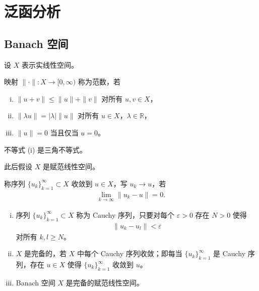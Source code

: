 \documentclass[../main.tex]{subfiles}
\begin{document}
\chapter{泛函分析}\label{chapter:appD-泛函分析}

\section{Banach 空间}\label{section:appD-Banach空间}

设 $X$ 表示实线性空间。

\begin{definition}\label{definition:appD-范数}
映射 $\|\cdot\|:X\to[0,\infty)$ 称为范数，若
\begin{enumerate}[(i)]
\item $\|u+v\|\leqslant\|u\|+\|v\|$ 对所有 $u,v\in X$，
\item $\|\lambda u\|=|\lambda|\|u\|$ 对所有 $u\in X$，$\lambda\in\mathbb{R}$，
\item $\|u\|=0$ 当且仅当 $u=0$。
\end{enumerate}
不等式 (i) 是三角不等式。
\end{definition}

此后假设 $X$ 是赋范线性空间。

\begin{definition}\label{definition:appD-收敛}
称序列 $\{u_k\}_{k=1}^\infty\subset X$ 收敛到 $u\in X$，写 $u_k\to u$，若
\begin{align*}
\lim_{k\to\infty}\|u_k-u\|=0.
\end{align*}
\end{definition}

\begin{definition}\label{definition:appD-完备}
\begin{enumerate}[(i)]
\item 序列 $\{u_k\}_{k=1}^\infty\subset X$ 称为 Cauchy 序列，只要对每个 $\varepsilon>0$ 存在 $N>0$ 使得
\begin{align*}
\|u_k-u_l\|<\varepsilon
\end{align*}
对所有 $k,l\geqslant N$。

\item $X$ 是完备的，若 $X$ 中每个 Cauchy 序列收敛；即每当 $\{u_k\}_{k=1}^\infty$ 是 Cauchy 序列，存在 $u\in X$ 使得 $\{u_k\}_{k=1}^\infty$ 收敛到 $u$。

\item Banach 空间 $X$ 是完备的赋范线性空间。
\end{enumerate}
\end{definition}
\end{document}
